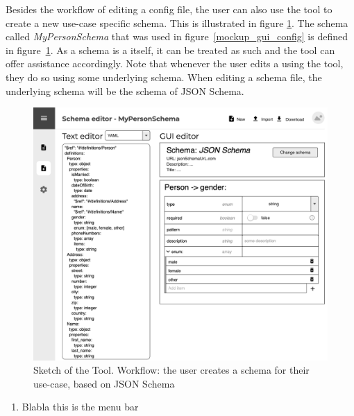 Besides the workflow of editing a config file, the user can also use the tool to create a new use-case specific schema.
This is illustrated in figure \ref{mockup_gui_schema}.
The schema called \textit{MyPersonSchema} that was used in figure~\ref{mockup_gui_config} is defined in figure~\ref{mockup_gui_schema}.
As a schema is a \cfgfile{} itself, it can be treated as such and the tool can offer assistance accordingly.
Note that whenever the user edits a \cfgfile{} using the tool, they do so using some underlying schema.
When editing a schema file, the underlying schema will be the schema of JSON Schema.

\begin{figure}[!t]
    \includegraphics[width=\textwidth]{figures/mockup_gui_schema}
    \caption{Sketch of the Tool. Workflow: the user creates a schema for their use-case, based on JSON Schema}
    \label{mockup_gui_schema}
\end{figure}

\begin{enumerate}
    \item Blabla this is the menu bar
\end{enumerate}



